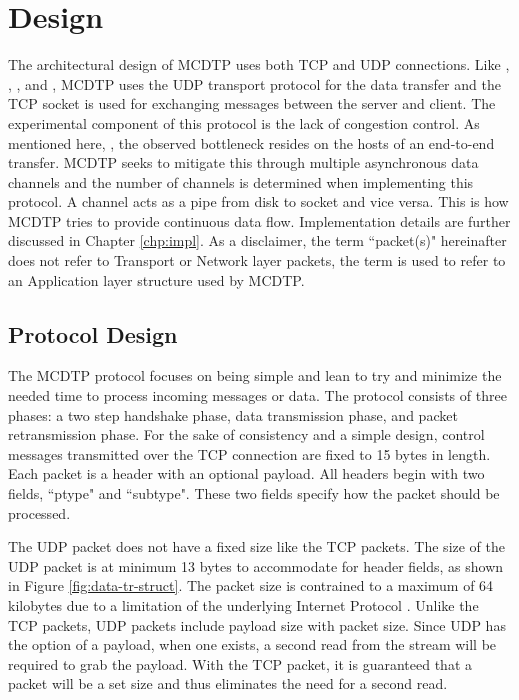 \chapter{Design}

The architectural design of MCDTP uses both TCP and UDP connections. Like \cite{He2002}, \cite{Fan2010}, \cite{Aspera2016}, and \cite{Meiss2007}, MCDTP uses the UDP transport protocol for the data transfer and the TCP socket is used for exchanging messages between the server and client. The experimental component of this protocol is the lack of congestion control. As mentioned here, \cite{Fan2010} \cite{Aspera2016}, the observed bottleneck resides on the hosts of an end-to-end transfer. MCDTP seeks to mitigate this through multiple asynchronous data channels and the number of channels is determined when implementing this protocol. A channel acts as a pipe from disk to socket and vice versa. This is how MCDTP tries to provide continuous data flow. Implementation details are further discussed in Chapter \ref{chp:impl}. As a disclaimer, the term ``packet(s)" hereinafter does not refer to Transport or Network layer packets, the term is used to refer to an Application layer structure used by MCDTP.

\section{Protocol Design}\label{sec:proto-des}

The MCDTP protocol focuses on being simple and lean to try and minimize the needed time to process incoming messages or data. The protocol consists of three phases: a two step handshake phase, data transmission phase, and packet retransmission phase. For the sake of consistency and a simple design, control messages transmitted over the TCP connection are fixed to 15 bytes in length. Each packet is a header with an optional payload. All headers begin with two fields, ``ptype" and ``subtype". These two fields specify how the packet should be processed.

The UDP packet does not have a fixed size like the TCP packets. The size of the UDP packet is at minimum 13 bytes to accommodate for header fields, as shown in Figure \ref{fig:data-tr-struct}. The packet size is contrained to a maximum of 64 kilobytes due to a limitation of the underlying Internet Protocol \cite{postel1981ip}. Unlike the TCP packets, UDP packets include payload size with packet size. Since UDP has the option of a payload, when one exists, a second read from the stream will be required to grab the payload. With the TCP packet, it is guaranteed that a packet will be a set size and thus eliminates the need for a second read.

